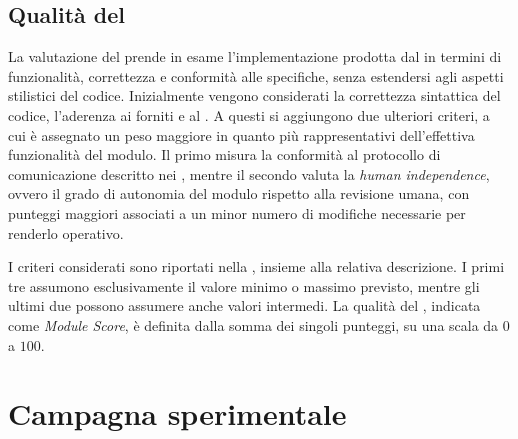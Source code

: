 \subsection{Qualità del \capture{}} %

La valutazione del \capture{} prende in esame l'implementazione prodotta dal \codeagent{} in termini di funzionalità, correttezza e conformità alle specifiche, senza estendersi agli aspetti stilistici del codice. Inizialmente vengono considerati la correttezza sintattica del codice, l'aderenza ai \templates{} forniti e al \schema{}. A questi si aggiungono due ulteriori criteri, a cui è assegnato un peso maggiore in quanto più rappresentativi dell'effettiva funzionalità del modulo. Il primo misura la conformità al protocollo di comunicazione descritto nei \report{}, mentre il secondo valuta la \emph{human independence}, ovvero il grado di autonomia del modulo rispetto alla revisione umana, con punteggi maggiori associati a un minor numero di modifiche necessarie per renderlo operativo.


I criteri considerati sono riportati nella , insieme alla relativa descrizione. I primi tre assumono esclusivamente il valore minimo o massimo previsto, mentre gli ultimi due possono assumere anche valori intermedi. La qualità del \capture{}, indicata come \emph{Module Score}, è definita dalla somma dei singoli punteggi, su una scala da $0$ a $100$.


\begin{table}[t]
    \centering
    \caption[Criteri di valutazione del \capture]{Criteri di valutazione del \capture{}.}
    \label{tab:module_criteria}
\end{table}

\section{Campagna sperimentale} %

